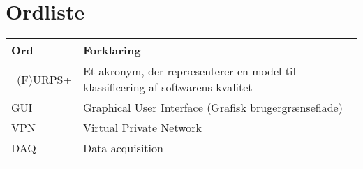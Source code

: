 \chapter{Ordliste}

\begin{longtabu} to 
    Ord &    Forklaring\\
    \toprule \
   (F)URPS+ &    Et akronym, der repræsenterer en model til klassificering af softwarens kvalitet\\
    GUI		&	Graphical User Interface (Grafisk brugergrænseflade)\\
    VPN		&	Virtual Private Network\\
    DAQ		&	Data acquisition \\
 
\label{forkort}
\end{longtabu}